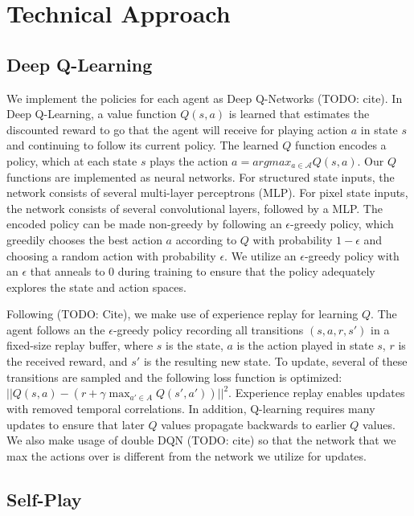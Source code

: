 \documentclass[10pt,twocolumn,letterpaper]{article}
\begin{document}
\section{Technical Approach}

\subsection{Deep Q-Learning}

We implement the policies for each agent as Deep Q-Networks (TODO:
cite). In Deep Q-Learning, a value function $Q(s, a)$ is learned that
estimates the discounted reward to go that the agent will receive for playing
action $a$ in state $s$ and continuing to follow its current policy. The
learned $Q$ function encodes a policy, which at each state $s$ plays the
action $a = argmax_{a \in \mathcal{A}}Q(s, a)$. Our $Q$ functions are
implemented as neural networks. For structured state inputs, the network
consists of several multi-layer perceptrons (MLP). For pixel state inputs, the
network consists of several convolutional layers, followed by a MLP. The
encoded policy can be made non-greedy by following an $\epsilon$-greedy
policy, which greedily chooses the best action $a$ according to $Q$ with
probability $1 - \epsilon$ and choosing a random action with probability
$\epsilon$. We utilize an $\epsilon$-greedy policy with an $\epsilon$ that
anneals to $0$ during training to ensure that the policy adequately explores
the state and action spaces.

Following (TODO: Cite), we make use of experience replay for learning $Q$. The
agent follows an the $\epsilon$-greedy policy recording all transitions $(s,
a, r, s')$ in a fixed-size replay buffer, where $s$ is the state, $a$ is the
action played in state $s$, $r$ is the received reward, and $s'$ is the
resulting new state. To update, several of these transitions are sampled and
the following loss function is optimized: $||Q(s, a) - (r + \gamma \max_{a'
\in A}Q(s', a'))||^2$. Experience replay enables updates with removed temporal
correlations. In addition, Q-learning requires many updates to ensure that
later $Q$ values propagate backwards to earlier $Q$ values. We also make usage
of double DQN (TODO: cite) so that the network that we max the actions over is
different from the network we utilize for updates.

\subsection{Self-Play}
\end{document}
